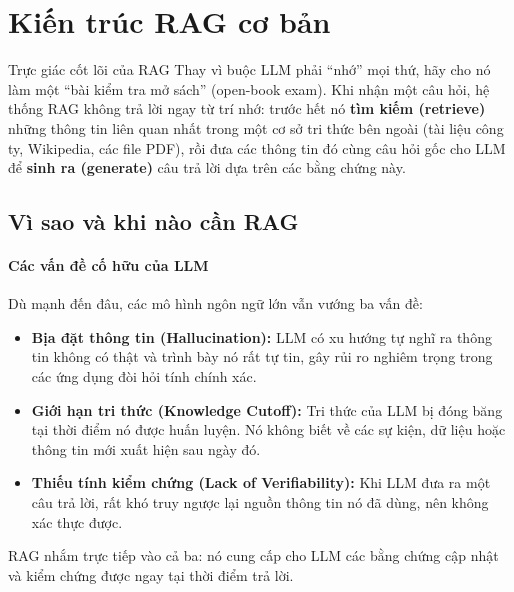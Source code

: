 
\section{Kiến trúc RAG cơ bản}
\label{sec:rag_intro}

\begin{keyidea}{Trực giác cốt lõi của RAG}
	Thay vì buộc LLM phải “nhớ” mọi thứ, hãy cho nó làm một “bài kiểm tra mở sách” (open-book exam). Khi nhận một câu hỏi, hệ thống RAG không trả lời ngay từ trí nhớ: trước hết nó \textbf{tìm kiếm (retrieve)} những thông tin liên quan nhất trong một cơ sở tri thức bên ngoài (tài liệu công ty, Wikipedia, các file PDF), rồi đưa các thông tin đó cùng câu hỏi gốc cho LLM để \textbf{sinh ra (generate)} câu trả lời dựa trên các bằng chứng này.
\end{keyidea}

\subsection{Vì sao và khi nào cần RAG}
\label{ssec:why_rag}

\paragraph{Các vấn đề cố hữu của LLM}
Dù mạnh đến đâu, các mô hình ngôn ngữ lớn vẫn vướng ba vấn đề:
\begin{itemize}
	\item \textbf{Bịa đặt thông tin (Hallucination):} LLM có xu hướng tự nghĩ ra thông tin không có thật và trình bày nó rất tự tin, gây rủi ro nghiêm trọng trong các ứng dụng đòi hỏi tính chính xác.
	\item \textbf{Giới hạn tri thức (Knowledge Cutoff):} Tri thức của LLM bị đóng băng tại thời điểm nó được huấn luyện. Nó không biết về các sự kiện, dữ liệu hoặc thông tin mới xuất hiện sau ngày đó.
	\item \textbf{Thiếu tính kiểm chứng (Lack of Verifiability):} Khi LLM đưa ra một câu trả lời, rất khó truy ngược lại nguồn thông tin nó đã dùng, nên không xác thực được.
\end{itemize}
RAG nhắm trực tiếp vào cả ba: nó cung cấp cho LLM các bằng chứng cập nhật và kiểm chứng được ngay tại thời điểm trả lời.

